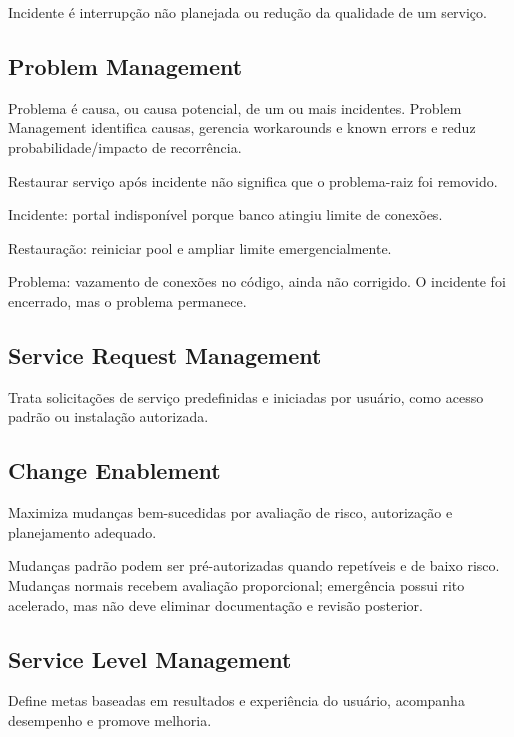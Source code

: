 Incidente é interrupção não planejada ou redução da qualidade de um serviço.

\subsection{Problem Management}

Problema é causa, ou causa potencial, de um ou mais incidentes. Problem Management identifica causas, gerencia workarounds e known errors e reduz probabilidade/impacto de recorrência.

Restaurar serviço após incidente não significa que o problema-raiz foi removido.

\begin{exemplo}
Incidente: portal indisponível porque banco atingiu limite de conexões.

Restauração: reiniciar pool e ampliar limite emergencialmente.

Problema: vazamento de conexões no código, ainda não corrigido. O incidente foi encerrado, mas o problema permanece.
\end{exemplo}

\subsection{Service Request Management}

Trata solicitações de serviço predefinidas e iniciadas por usuário, como acesso padrão ou instalação autorizada.

\subsection{Change Enablement}

Maximiza mudanças bem-sucedidas por avaliação de risco, autorização e planejamento adequado.

Mudanças padrão podem ser pré-autorizadas quando repetíveis e de baixo risco. Mudanças normais recebem avaliação proporcional; emergência possui rito acelerado, mas não deve eliminar documentação e revisão posterior.

\subsection{Service Level Management}

Define metas baseadas em resultados e experiência do usuário, acompanha desempenho e promove melhoria.

